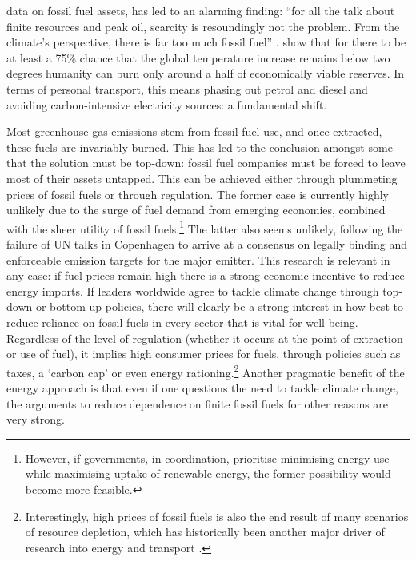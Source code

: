 data on fossil fuel assets, has led to an alarming finding: ``for all the
talk about finite resources and peak oil, scarcity is resoundingly not the
problem. From the climate's perspective, there is far too much fossil fuel''
\citep[p.~29]{Berners-Lee2013}.
\citet{Berners-Lee2013} show that for there to be at least a 75\% chance
that the global temperature increase remains below two degrees humanity can
burn only around a half of economically viable reserves.
In terms of personal transport, this means
phasing out petrol and diesel and avoiding carbon-intensive electricity sources:
a fundamental shift.

Most greenhouse gas emissions stem from fossil fuel use, and once
extracted, these fuels are invariably burned. This has led to the conclusion
amongst some that the solution must be top-down:
fossil fuel companies must be forced to leave most of their assets untapped.
This can be achieved 
either through plummeting prices of fossil fuels or through regulation.
The former case is currently highly unlikely due to the surge of fuel demand from
emerging economies, combined with the sheer utility of fossil
fuels.\footnote{However,
if governments, in coordination,
prioritise minimising energy use while maximising
uptake of renewable energy, the former possibility would become more feasible.
}
The latter also seems unlikely, following the failure of UN talks in
Copenhagen to arrive at a consensus on legally binding
and enforceable emission targets for the major emitter.
This research is relevant in any case: if fuel prices remain high there
is a strong economic incentive to reduce energy imports. If leaders worldwide
agree to tackle climate change through top-down or bottom-up
policies, there will clearly be a strong interest in how best to
reduce reliance on fossil fuels in every sector that is vital for
well-being. Regardless of the level of regulation (whether it
occurs at the point of extraction or use of fuel), it implies high consumer prices
for fuels, through policies such as taxes, a
`carbon cap' or even energy rationing.\footnote{Interestingly, high prices of fossil
fuels is also the end result of many scenarios of resource depletion, which
has historically been another major driver of research into energy and
transport \citep{Fels1973}.}
Another pragmatic benefit of the energy approach is that even if one questions
the need to tackle climate change, the arguments to reduce dependence on
finite fossil fuels for other reasons are very strong.

